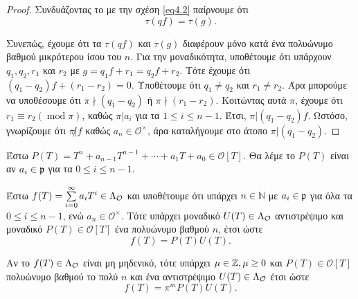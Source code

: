 \begin{proof}
	\noindent Συνδυάζοντας το με την σχέση \ref{eq4.2} παίρνουμε ότι 
	$$\tau(qf) = \tau(g).$$

	\noindent Συνεπώς, έχουμε ότι τα $\tau(qf)$ και $\tau(g)$ διαφέρουν μόνο κατά ένα πολυώνυμο βαθμού μικρότερου ίσου του $n$. Για την μοναδικότητα, 
	υποθέτουμε ότι υπάρχουν $q_1,q_2,r_1$ και $r_2$ με $g= q_1f +r_1 = q_2 f +r_2$. Τότε έχουμε ότι $(q_1-q_2)f + (r_1-r_2) = 0$. Υποθέτουμε ότι 
	$q_1 \neq q_2$ και $r_1\neq r_2$. Άρα μπορούμε να υποθέσουμε ότι $\pi \nmid (q_1-q_2)$ ή $\pi \nmid (r_1-r_2)$. Κοιτώντας αυτά  $\pi$, έχουμε 
	ότι $r_1 \equiv r_2 (\operatorname{mod} \pi)$, καθώς $\pi|a_i$ για τα $1\leq i \leq n-1$. Έτσι, $\pi | (q_1-q_2)f$. Ωστόσο, γνωρίζουμε ότι $\pi\not | f$ 
	καθώς $a_n \in \mathcal{O}^\times$, άρα καταλήγουμε στο άτοπο $\pi | (q_1 - q_2)$.
\end{proof}


\begin{defn} Έστω $P(T) = T^n + a_{n-1}T^{n-1} + \cdots + a_1 T + a_0 \in \mathcal{O}[T]$. Θα λέμε το $P(T)$ είναι  αν $a_i \in \mathfrak{p}$ για τα $0\leq i \leq n-1$.
\end{defn}

\begin{theorem}
	Έστω $f(T) = \sum\limits_{i=0}^\infty a_i T^i \in \Lambda_\mathcal{O}$ και υποθέτουμε ότι υπάρχει $n \in \mathbb{N}$ με $a_i\in \mathfrak{p}$ για όλα τα $0\leq i \leq n-1$, ενώ $a_n \in \mathcal{O}^\times$. Τότε υπάρχει μοναδικό $U(T) \in \Lambda_\mathcal{O}$ αντιστρέψιμο και μοναδικό $P(T) \in \mathcal{O}[T]$ ένα  πολυώνυμο βαθμού $n$, έτσι ώστε
	$$f(T) = P(T)U(T).$$

	\noindent Αν το $f(T) \in \Lambda_\mathcal{O}$ είναι μη μηδενικό, τότε υπάρχει $\mu \in \mathbb{Z}, \mu \geq 0$ και $P(T) \in \mathcal{O}[T]$  πολυώνυμο βαθμού 
	το πολύ $n$ και ένα αντιστρέψιμο $U(T)\in \Lambda_\mathcal{O}$ έτσι ώστε
	$$f(T) = \pi^m P(T) U(T).$$
\end{theorem}

